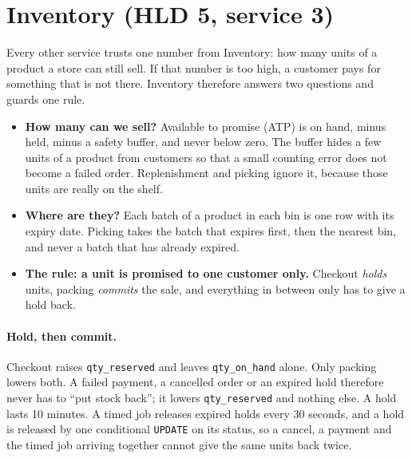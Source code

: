 
\section{Inventory (HLD 5, service 3)}
\label{sec:m1-inventory}

Every other service trusts one number from Inventory: how many units of a product a store can still sell. If that
number is too high, a customer pays for something that is not there. Inventory therefore answers two questions and
guards one rule.

\begin{itemize}
  \item \textbf{How many can we sell?} Available to promise (ATP) is on hand, minus held, minus a safety buffer, and
    never below zero. The buffer hides a few units of a product from customers so that a small counting error does
    not become a failed order. Replenishment and picking ignore it, because those units are really on the shelf.
  \item \textbf{Where are they?} Each batch of a product in each bin is one row with its expiry date. Picking takes the
    batch that expires first, then the nearest bin, and never a batch that has already expired.
  \item \textbf{The rule: a unit is promised to one customer only.} Checkout \emph{holds} units, packing
    \emph{commits} the sale, and everything in between only has to give a hold back.
\end{itemize}

\paragraph{Hold, then commit.} Checkout raises \texttt{qty\_reserved} and leaves \texttt{qty\_on\_hand} alone. Only
packing lowers both. A failed payment, a cancelled order or an expired hold therefore never has to ``put stock
back''; it lowers \texttt{qty\_reserved} and nothing else. A hold lasts 10 minutes. A timed job releases expired
holds every 30 seconds, and a hold is released by one conditional \texttt{UPDATE} on its status, so a cancel, a
payment and the timed job arriving together cannot give the same units back twice.

